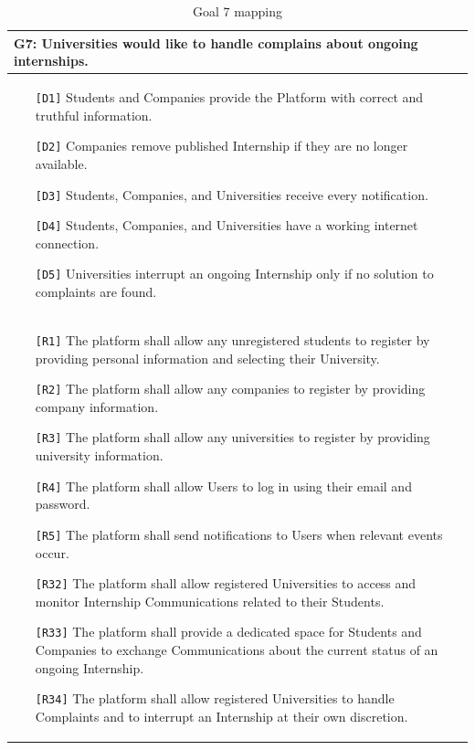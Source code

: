 \begin{table}[H]
    \centering
    \begin{tabular}{|p{15cm}|}
        \hline
        \textbf{G7:} Universities would like to handle complains about ongoing internships. \\ \hline
        \begin{itemize}
            \item[\texttt{[D1]}] Students and Companies provide the Platform with correct and truthful information.
            \item[\texttt{[D2]}] Companies remove published Internship if they are no longer available. 
            \item[\texttt{[D3]}] Students, Companies, and Universities receive every notification.
            \item[\texttt{[D4]}] Students, Companies, and Universities have a working internet connection.
            \item[\texttt{[D5]}] Universities interrupt an ongoing Internship only if no solution to complaints are found.
        \end{itemize} \\ \hline
        \begin{itemize}
            \item[\texttt{[R1]}] The platform shall allow any unregistered students to register by providing personal information and selecting their University.
            \item[\texttt{[R2]}] The platform shall allow any companies to register by providing company information.
            \item[\texttt{[R3]}] The platform shall allow any universities to register by providing university information.
            \item[\texttt{[R4]}] The platform shall allow Users to log in using their email and password.
            \item[\texttt{[R5]}] The platform shall send notifications to Users when relevant events occur.
            \item[\texttt{[R32]}] The platform shall allow registered Universities to access and monitor Internship Communications related to their Students.
            \item[\texttt{[R33]}] The platform shall provide a dedicated space for Students and Companies to exchange Communications about the current status of an ongoing Internship.
            \item[\texttt{[R34]}] The platform shall allow registered Universities to handle Complaints and to interrupt an Internship at their own discretion.
        \end{itemize} \\ \hline
    \end{tabular}
    \caption{Goal 7 mapping}
    \label{tab:G7}
\end{table}


